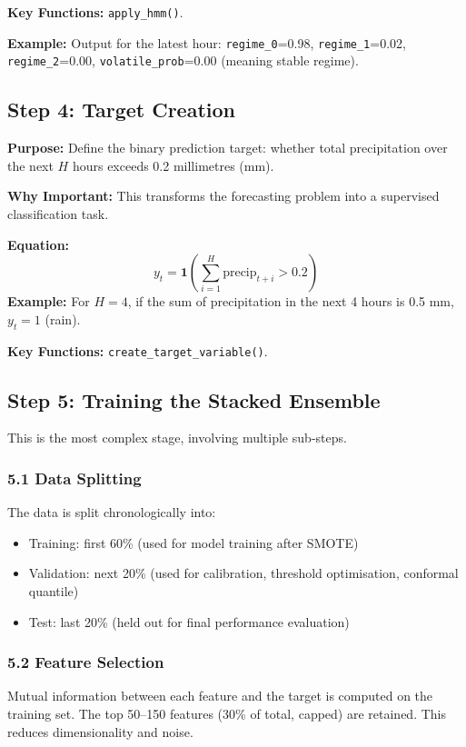 \documentclass[12pt]{article}
\begin{document}
	\textbf{Key Functions:} \texttt{apply\_hmm()}.
	
	\textbf{Example:} Output for the latest hour: \texttt{regime\_0}=0.98, \texttt{regime\_1}=0.02, \texttt{regime\_2}=0.00, \texttt{volatile\_prob}=0.00 (meaning stable regime).
	
	\subsection{Step 4: Target Creation}
	\textbf{Purpose:} Define the binary prediction target: whether total precipitation over the next $H$ hours exceeds 0.2 millimetres (mm).
	
	\textbf{Why Important:} This transforms the forecasting problem into a supervised classification task.
	
	\textbf{Equation:}
	\[
	y_t = \mathbf{1}\!\left(\sum_{i=1}^{H} \text{precip}_{t+i} > 0.2\right)
	\]
	\textbf{Example:} For $H=4$, if the sum of precipitation in the next 4 hours is 0.5 mm, $y_t=1$ (rain).
	
	\textbf{Key Functions:} \texttt{create\_target\_variable()}.
	
	\subsection{Step 5: Training the Stacked Ensemble}
	This is the most complex stage, involving multiple sub‑steps.
	
	\subsubsection{5.1 Data Splitting}
	The data is split chronologically into:
	\begin{itemize}
		\item Training: first 60\% (used for model training after SMOTE)
		\item Validation: next 20\% (used for calibration, threshold optimisation, conformal quantile)
		\item Test: last 20\% (held out for final performance evaluation)
	\end{itemize}
	
	\subsubsection{5.2 Feature Selection}
	Mutual information between each feature and the target is computed on the training set. The top 50–150 features (30\% of total, capped) are retained. This reduces dimensionality and noise.
	
\end{document}
